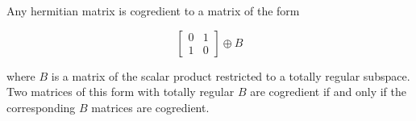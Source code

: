 Any hermitian matrix is cogredient to a matrix of the form

$$\begin{bmatrix}
0 & 1 \\
1 & 0
\end{bmatrix} \oplus B$$

where $B$ is a matrix of the scalar product restricted to a totally regular subspace. Two matrices of this form with totally regular $B$ are cogredient if and only if the corresponding $B$ matrices are cogredient.

